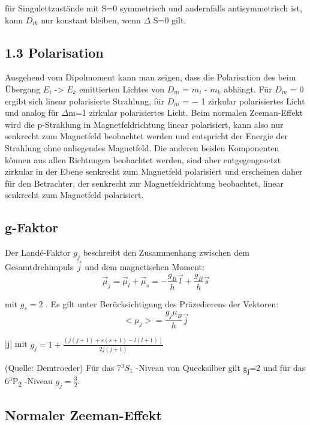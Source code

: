 \documentclass[10pt,a4paper]{article}
\begin{document}
für Singulettzustände mit S=0 symmetrisch und andernfalls antisymmetrisch ist, kann $D_{ik}$ nur konstant bleiben, wenn $\Delta$ S=0 gilt.


\subsection{1.3 Polarisation}


Ausgehend vom Dipolmoment kann man zeigen, dass die Polarisation des beim Übergang $E_i$ -> $E_k$  emittierten Lichtes von $D_m$ = $m_{i}$ - $m_{k}$  abhängt. Für $D_{m}$ =  0 ergibt sich linear polarisierte Strahlung, für $D_m$ = − 1 zirkular polarisiertes Licht und analog für $\Delta$m=1 zirkular polarisiertes Licht. Beim normalen Zeeman-Effekt wird die p-Strahlung in Magnetfeldrichtung linear polarisiert, kann also nur senkrecht zum Magnetfeld beobachtet werden und entspricht der Energie der Strahlung ohne anliegendes Magnetfeld. Die anderen beiden Komponenten können aus allen Richtungen beobachtet werden, sind aber entgegengesetzt zirkular in der Ebene senkrecht zum Magnetfeld polarisiert und erscheinen daher für den Betrachter, der senkrecht zur Magnetfeldrichtung beobachtet, linear senkrecht zum Magnetfeld polarisiert.

\subsection{ g-Faktor}

Der Landé-Faktor $g_j$ beschreibt den Zusammenhang zwischen dem Gesamtdrehimpuls $\overrightarrow{j}$ und dem magnetischen Moment:
\begin{equation}
\overrightarrow{\mu}_{j}= \overrightarrow{\mu}_{l}+\overrightarrow{\mu}_{s}=−
\frac {g_{B}}{h}
\overrightarrow{l} + \frac {g_{B}}{h}
\overrightarrow{s}
\end{equation}

mit $g_{s} = 2$ .  Es gilt unter Berücksichtigung des Präzedierens der Vektoren:
\begin{equation}
 <\mu_{j}>= \frac {g_{j}\mu_{B}}{h}\overrightarrow{j}
\end{equation}

 |j| mit $g_{j}=1+\frac{(j(j+1)+s(s+1)−l(l+1))}{2j(j+1)}$

(Quelle: Demtroeder)
 Für das 7$^3S_{1}$ -Niveau von Quecksilber gilt g\textsubscript{j}=2 und für das 6$^3$P\textsubscript{2} -Niveau $g_{j}=\frac{3}{2} $.
 
\subsection{Normaler Zeeman-Effekt}
\end{document}
